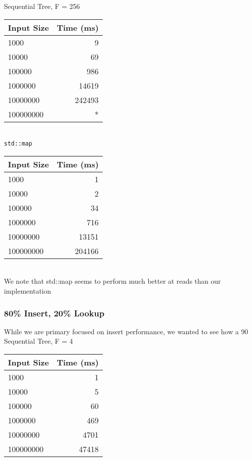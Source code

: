 \documentclass{sig-alternate}
\begin{document}
Sequential Tree, F = 256\\
\begin{tabular}{| l | r |}
  \hline
  Input Size & Time (ms)\\  \hline
  1000			&	9	\\
  10000			&	69	\\
  100000		&	986	\\
  1000000		&	14619	\\
  10000000		&	242493	\\
  100000000		&	*	\\
  \hline
\end{tabular}\\

\texttt{std::map}\\
\begin{tabular}{| l | r |}
  \hline
  Input Size & Time (ms)\\  \hline
  1000			&	1	\\
  10000			&	2	\\
  100000		&	34	\\
  1000000		&	716	\\
  10000000		&	13151	\\
  100000000		&	204166	\\
  \hline
\end{tabular}\\
We note that std::map seems to perform much better at reads than our implementation 

\subsubsection{80\% Insert, 20\% Lookup}
While we are primary focused on insert performance, we wanted to see how a 90%
Sequential Tree, F = 4\\
\begin{tabular}{| l | r |}
  \hline
  Input Size & Time (ms)\\  \hline
  1000			&	1	\\
  10000			&	5	\\
  100000		&	60	\\
  1000000		&	469	\\
  10000000		&	4701	\\
  100000000		&	47418	\\
  \hline
\end{tabular} \\
\end{document}
